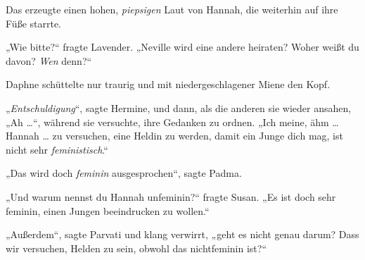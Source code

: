 Das erzeugte einen hohen, \emph{piepsigen} Laut von Hannah, die weiterhin auf ihre Füße starrte.

„Wie bitte?“ fragte Lavender.
„Neville wird eine andere heiraten? Woher weißt du davon? \emph{Wen} denn?“

Daphne schüttelte nur traurig und mit niedergeschlagener Miene den Kopf.

„\emph{Entschuldigung}“, sagte Hermine, und dann, als die anderen sie wieder ansahen,
„Ah …“, während sie versuchte, ihre Gedanken zu ordnen.
„Ich meine, ähm … Hannah … zu versuchen, eine Heldin zu werden, damit ein Junge dich mag, ist nicht sehr \emph{feministisch}.“

„Das wird doch \emph{feminin} ausgesprochen“, sagte Padma.

„Und warum nennst du Hannah unfeminin?“ fragte Susan.
„Es ist doch sehr feminin, einen Jungen beeindrucken zu wollen.“

„Außerdem“, sagte Parvati und klang verwirrt, „geht es nicht genau darum? Dass wir versuchen, Helden zu sein, obwohl das nichtfeminin ist?“

